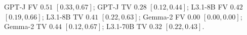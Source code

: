 GPT-J FV $0.51$ $[0.33,0.67]$; GPT-J TV $0.28$ $[0.12,0.44]$; L3.1-8B FV $0.42$ $[0.19,0.66]$; L3.1-8B TV $0.41$ $[0.22,0.63]$; Gemma-2 FV $0.00$ $[0.00,0.00]$; Gemma-2 TV $0.44$ $[0.12,0.67]$; L3.1-70B TV $0.32$ $[0.22,0.43]$.
